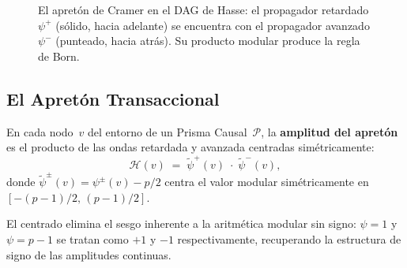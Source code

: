 \documentclass[11pt, a4paper, openany]{book}
\begin{document}
\begin{figure}[ht]
\centering
{}
\caption{El apret\'on de Cramer en el DAG de Hasse: el propagador
retardado $\psi^+$ (s\'olido, hacia adelante) se encuentra con el
propagador avanzado $\psi^-$ (punteado, hacia atr\'as). Su producto
modular produce la regla de Born.}
\label{fig:cramer-handshake}
\end{figure}

\subsection{El Apret\'on Transaccional}

\begin{definition}
\label{def:handshake}
En cada nodo~$v$ del entorno de un Prisma
Causal~$\mathcal{P}$, la \textbf{amplitud del apret\'on} es el
producto de las ondas retardada y avanzada centradas sim\'etricamente:
\[
  \mathcal{H}(v) \;=\;
  \widetilde{\psi}^{+}(v) \;\cdot\;
  \widetilde{\psi}^{-}(v),
\]
donde $\widetilde{\psi}^{\pm}(v) = \psi^{\pm}(v) - p/2$ centra el
valor modular sim\'etricamente en $[-(p-1)/2,\, (p-1)/2]$.
\end{definition}

\noindent
El centrado elimina el sesgo inherente a la aritm\'etica modular sin
signo: $\psi = 1$ y $\psi = p - 1$ se tratan como $+1$ y $-1$
respectivamente, recuperando la estructura de signo de las amplitudes
continuas.
\end{document}
